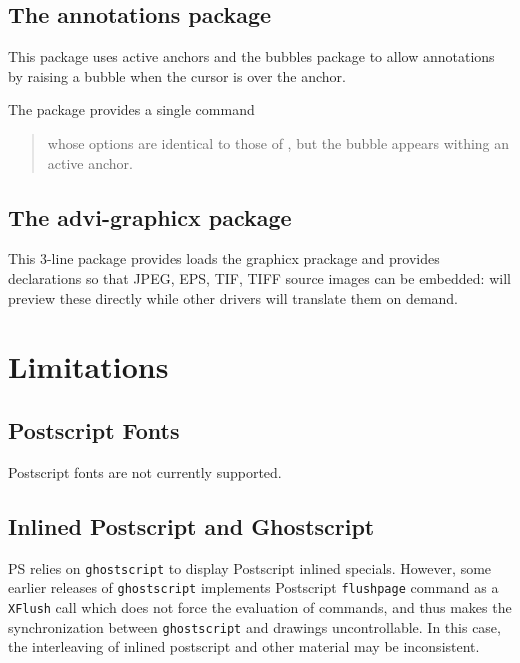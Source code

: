 \documentclass[12pt]{article}
\begin{document}
\subsection{The annotations package}

This package uses active anchors and the bubbles package to 
allow annotations by raising a bubble when the cursor is over the anchor.

The package provides a single command

\medskip\noindent
\docdef \adviannot {}%
\begin{quote}
whose options are identical to those of \docdef \bubble, but the bubble
appears withing an active anchor. 
\end{quote}


\subsection{\label {advi-grahicx}The advi-graphicx package}

This 3-line package provides loads the graphicx prackage and provides
declarations so that JPEG, EPS, TIF, TIFF source images can be embedded:
{\ActiveDVI} will preview these directly while other drivers will translate
them on demand. 

\appendix

\section {Limitations}

\subsection*{Postscript Fonts}

Postscript fonts are not currently supported. 

\subsection*{Inlined Postscript and Ghostscript}

PS relies on {\tt ghostscript} to display Postscript inlined specials.
However, some earlier releases of {\tt ghostscript} 
implements Postscript {\tt flushpage} command as a {\tt XFlush} call
which does not force the evaluation of commands, and thus makes the 
synchronization between {\tt ghostscript} and {\ActiveDVI} drawings 
uncontrollable. In this case, the interleaving of inlined postscript 
and other material may be inconsistent. 
\end{document}
